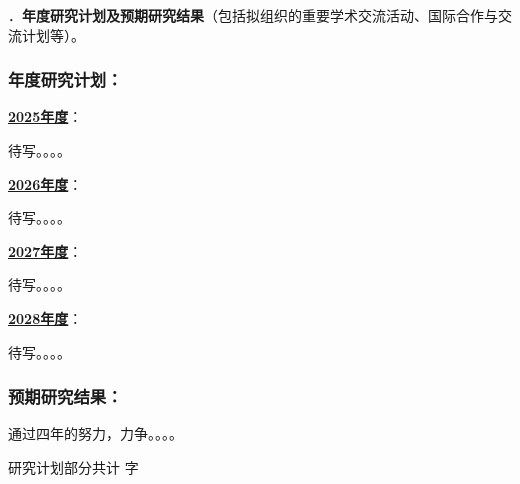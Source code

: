 {\sihao \color{MsBlue} ．{\bfseries 年度研究计划及预期研究结果}（包括拟组织的重要学术交流活动、国际合作与交流计划等）。}

\subsubsection{{\bfseries 年度研究计划：}}

\uline{\bfseries 2025年度}：

待写。。。。

\uline{\bfseries 2026年度}：

待写。。。。

\uline{\bfseries 2027年度}：

待写。。。。

\uline{\bfseries 2028年度}：

待写。。。。


\subsubsection{{\bfseries 预期研究结果：}}

通过四年的努力，力争。。。。


\ifhandout
\else
\begin{center}
{\larger[2]\color{red}  研究计划部分共计 \wordcount 字 }
\end{center}
\fi


\vskip 5mm
